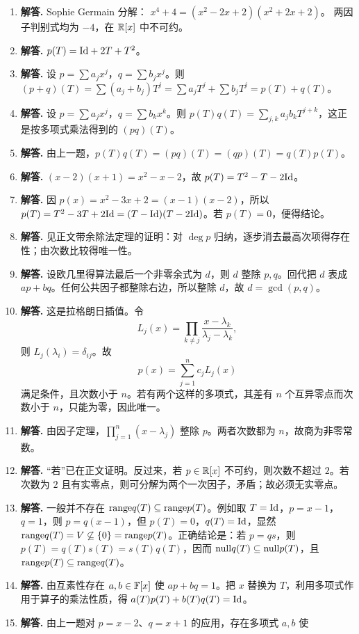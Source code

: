 \begin{enumerate}[label=\textbf{\arabic*.}, leftmargin=*, itemsep=1em]
$x^4+1=(x^2+\sqrt2 x+1)(x^2-\sqrt2 x+1)$。
\item \textbf{解答.} Sophie Germain 分解：
$x^4+4=(x^2-2x+2)(x^2+2x+2)$。
两因子判别式均为 $-4$，在 $\mathbb{R}[x]$ 中不可约。
\item \textbf{解答.} $p(T)=\mathrm{Id}+2T+T^2$。
\item \textbf{解答.} 设 $p=\sum a_jx^j$，$q=\sum b_jx^j$。则 $(p+q)(T)=\sum (a_j+b_j)T^j=\sum a_jT^j+\sum b_jT^j=p(T)+q(T)$。
\item \textbf{解答.} 设 $p=\sum a_jx^j$，$q=\sum b_kx^k$。则
$p(T)q(T)=\sum_{j,k}a_jb_kT^{j+k}$，这正是按多项式乘法得到的 $(pq)(T)$。
\item \textbf{解答.} 由上一题，$p(T)q(T)=(pq)(T)=(qp)(T)=q(T)p(T)$。
\item \textbf{解答.} $(x-2)(x+1)=x^2-x-2$，故 $p(T)=T^2-T-2\mathrm{Id}$。
\item \textbf{解答.} 因 $p(x)=x^2-3x+2=(x-1)(x-2)$，所以
$p(T)=T^2-3T+2\mathrm{Id}=(T-\mathrm{Id})(T-2\mathrm{Id})$。若 $p(T)=0$，便得结论。
\item \textbf{解答.} 见正文带余除法定理的证明：对 $\deg p$ 归纳，逐步消去最高次项得存在性；由次数比较得唯一性。
\item \textbf{解答.} 设欧几里得算法最后一个非零余式为 $d$，则 $d$ 整除 $p,q$。回代把 $d$ 表成 $ap+bq$。任何公共因子都整除右边，所以整除 $d$，故 $d=\gcd(p,q)$。
\item \textbf{解答.} 这是拉格朗日插值。令
\[
L_j(x)=\prod_{k\ne j}\frac{x-\lambda_k}{\lambda_j-\lambda_k},
\]
则 $L_j(\lambda_i)=\delta_{ij}$。故
\[
p(x)=\sum_{j=1}^n c_jL_j(x)
\]
满足条件，且次数小于 $n$。若有两个这样的多项式，其差有 $n$ 个互异零点而次数小于 $n$，只能为零，因此唯一。
\item \textbf{解答.} 由因子定理，$\prod_{j=1}^n(x-\lambda_j)$ 整除 $p$。两者次数都为 $n$，故商为非零常数。
\item \textbf{解答.} “若”已在正文证明。反过来，若 $p\in\mathbb{R}[x]$ 不可约，则次数不超过 $2$。若次数为 $2$ 且有实零点，则可分解为两个一次因子，矛盾；故必须无实零点。
\item \textbf{解答.} 一般并不存在 $\mathrm{range} q(T)\subseteq \mathrm{range} p(T)$。例如取 $T=\mathrm{Id}$，$p=x-1$，$q=1$，则 $p=q(x-1)$，但 $p(T)=0$，$q(T)=\mathrm{Id}$，显然 $\mathrm{range} q(T)=V\not\subseteq\{0\}=\mathrm{range} p(T)$。正确结论是：若 $p=qs$，则 $p(T)=q(T)s(T)=s(T)q(T)$，因而
$\mathrm{null} q(T)\subseteq \mathrm{null} p(T)$，且 $\mathrm{range} p(T)\subseteq \mathrm{range} q(T)$。
\item \textbf{解答.} 由互素性存在 $a,b\in\mathbb{F}[x]$ 使 $ap+bq=1$。把 $x$ 替换为 $T$，利用多项式作用于算子的乘法性质，得
$a(T)p(T)+b(T)q(T)=\mathrm{Id}$。
\item \textbf{解答.} 由上一题对 $p=x-2$、$q=x+1$ 的应用，存在多项式 $a,b$ 使

\end{enumerate}
